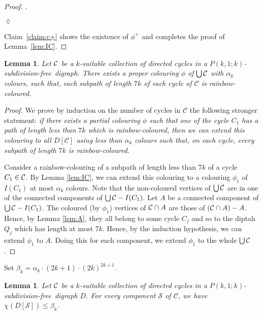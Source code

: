 \documentclass[utf8,10pt]{article}
\theoremstyle{plain}
\newtheorem{lemma}[theorem]{Lemma}
\theoremstyle{definition}
\theoremstyle{remark}
\newenvironment{subproof}{\par\noindent {\it Subproof}.\ }{\hfill$\lozenge$\par\vspace{11pt}}
\newcommand{\free}{subdivision-free}
\begin{document}
\begin{proof}
\begin{subproof}
\begin{itemize}
\begin{itemize}
	\end{itemize}
\end{itemize}
\end{subproof}

Claim~\ref{claim:c+} shows the existence of $\phi^+$ and completes the proof of Lemma~\ref{lem:IC}.
\end{proof}




\begin{lemma}\label{lem:col-union-cycle}
Let ${\cal C}$ be a $k$-suitable collection of directed cycles in a $P(k,1;k)$-\free\ digraph.
There exists a proper colouring $\phi$ of $\bigcup{\cal C}$ with $\alpha_k$ colours, such that, each subpath of length $7k$ of each cycle of $\mathcal{C}$ is rainbow-coloured.
\end{lemma}
\begin{proof}
We prove by induction on the number of cycles in $\mathcal{C}$ the following stronger statement:
{\it if there exists
a partial colouring $\phi$ such that one of the cycle $C_1$ has a path of length less than $7k$
which is rainbow-coloured, then we can extend this colouring to all $D[\mathcal{C}]$ using less
than $\alpha_k$ colours such that, on each cycle, every subpath of length
$7k$ is rainbow-coloured}.

Consider a rainbow-colouring of a subpath of length less than $7k$ of a cycle $C_1\in {\cal C}$.
By Lemma \ref{lem:IC}, we can extend this colouring to a colouring $\phi_1$ of $I(C_1)$ at most $\alpha_k$ colours.
Note that the non-coloured vertices of $\bigcup{\cal C}$ are in one of the connected components of $\bigcup{\cal C} - I(C_1)$.
Let $A$ be a connected component of $\bigcup{\cal C} - I(C_1)$. The coloured (by $\phi_1$) vertices of ${\cal C}\cap A$ are those of $({\cal C}\cap A)-A$. Hence, by Lemma \ref{lem:A}, they all belong to some cycle $C_j$ and so to the diptah $Q_j$ which has length at most $7k$.
Hence, by the induction hypothesis, we can extend $\phi_1$ to $A$. Doing this for each component, we extend $\phi_1$ to the whole $\bigcup{\cal C}$.
\end{proof}



Set $\beta_k=\alpha_k \cdot (2k+1) \cdot(2k)^{2k+1}$.

\begin{lemma}\label{lem:DC}
Let ${\cal C}$ be a $k$-suitable collection of directed cycles in a $P(k,1;k)$-\free\ digraph $D$.
For every component $\mathcal{S}$ of $\mathcal{C}$, we have $\chi(D[\mathcal{S}]) \leq \beta_k$.
\end{lemma}
\end{document}
